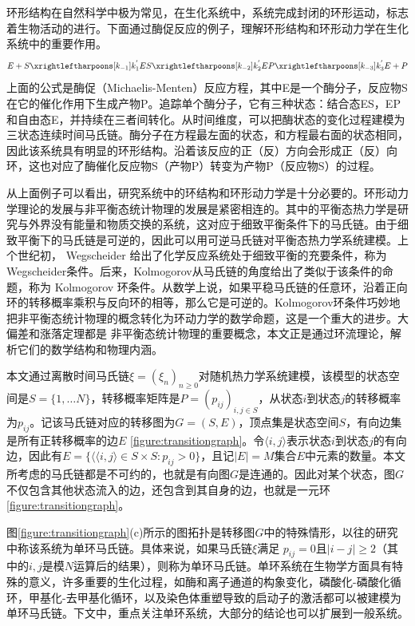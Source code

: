 

环形结构在自然科学中极为常见，在生化系统中，系统完成封闭的环形运动，标志着生物活动的进行。下面通过酶促反应的例子，理解环形结构和环形动力学在生化系统中的重要作用。
\begin{equation*}
    E + S \xrightleftharpoons[k_{-1}]{k^{'}_1}
    ES \xrightleftharpoons[k_{-2}]{k^{'}_2}
    EP \xrightleftharpoons[k_{-3}]{k^{'}_3}
    E + P
\end{equation*}
上面的公式是酶促（Michaelis-Menten）反应方程，其中E是一个酶分子，反应物S在它的催化作用下生成产物P。追踪单个酶分子，它有三种状态：结合态ES，EP和自由态E，并持续在三者间转化。从时间维度，可以把酶状态的变化过程建模为三状态连续时间马氏链。酶分子在方程最左面的状态，和方程最右面的状态相同，因此该系统具有明显的环形结构。沿着该反应的正（反）方向会形成正（反）向环，这也对应了酶催化反应物S（产物P）转变为产物P（反应物S）的过程。

从上面例子可以看出，研究系统中的环结构和环形动力学是十分必要的。环形动力学理论的发展与非平衡态统计物理的发展是紧密相连的。其中的平衡态热力学是研究与外界没有能量和物质交换的系统，这对应于细致平衡条件下的马氏链。由于细致平衡下的马氏链是可逆的，因此可以用可逆马氏链对平衡态热力学系统建模。上个世纪初， Wegscheider 给出了化学反应系统处于细致平衡的充要条件，称为Wegscheider条件。后来，Kolmogorov从马氏链的角度给出了类似于该条件的命题，称为 Kolmogorov 环条件。从数学上说，如果平稳马氏链的任意环，沿着正向环的转移概率乘积与反向环的相等，那么它是可逆的。Kolmogorov环条件巧妙地把非平衡态统计物理的概念转化为环动力学的数学命题，这是一个重大的进步。大偏差和涨落定理都是
非平衡态统计物理的重要概念，本文正是通过环流理论，解析它们的数学结构和物理内涵。

本文通过离散时间马氏链$\xi = (\xi_n)_{n \ge 0}$对随机热力学系统建模，该模型的状态空间是$S = \{1, \dots N\}$，转移概率矩阵是$P=(p_{ij})_{i,j \in S}$，从状态$i$到状态$j$的转移概率为$p_{ij}$。记该马氏链对应的转移图为$G=(S, E)$，顶点集是状态空间$S$，有向边集是所有正转移概率的边$E$ \ref{figure:transitiongraph}。令$\langle i, j\rangle$表示状态$i$到状态$j$的有向边，因此有$E = \{\langle \langle i, j\rangle \in S \times S: p_{ij}>0\}$，且记$|E| = M$集合$E$中元素的数量。本文所考虑的马氏链都是不可约的，也就是有向图$G$是连通的。因此对某个状态，图$G$不仅包含其他状态流入的边，还包含到其自身的边，也就是一元环 \ref{figure:transitiongraph}。

图\ref{figure:transitiongraph}(c)所示的图拓扑是转移图$G$中的特殊情形，以往的研究中称该系统为单环马氏链。具体来说，如果马氏链$\xi$满足 $p_{ij}=0$且$|i-j| \ge 2$（其中的$i,j$是模$N$运算后的结果），则称为单环马氏链。单环系统在生物学方面具有特殊的意义，许多重要的生化过程，如酶和离子通道的构象变化\cite{cornish2013fundamentals,sakmann2013single}，磷酸化-磷酸化循环\cite{beard2008chemical}，甲基化-去甲基化循环\cite{jia2017nonequilibrium}，以及染色体重塑导致的启动子的激活\cite{pedraza2008effects,jia2022analytical}都可以被建模为单环马氏链。下文中，重点关注单环系统，大部分的结论也可以扩展到一般系统。

